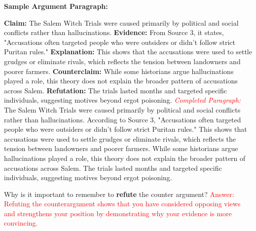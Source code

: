 \documentclass[12pt]{article}
\begin{document}
\vspace{1em}

\begin{tcolorbox}[colframe=black!60, colback=white, 
coltitle=black, colbacktitle=black!15, fonttitle=\bfseries\Large, 
title=Example Paragraph: Writing a Claim, halign title=center, left=10pt, right=10pt, top=10pt, bottom=15pt]
\textbf{Sample Argument Paragraph:}

\textbf{Claim:} The Salem Witch Trials were caused primarily by political and social conflicts rather than hallucinations.  
\textbf{Evidence:} From Source 3, it states, "Accusations often targeted people who were outsiders or didn’t follow strict Puritan rules."  
\textbf{Explanation:} This shows that the accusations were used to settle grudges or eliminate rivals, which reflects the tension between landowners and poorer farmers.  
\textbf{Counterclaim:} While some historians argue hallucinations played a role, this theory does not explain the broader pattern of accusations across Salem.  
\textbf{Refutation:} The trials lasted months and targeted specific individuals, suggesting motives beyond ergot poisoning.  
\textcolor{red}{\textit{Completed Paragraph:}} The Salem Witch Trials were caused primarily by political and social conflicts rather than hallucinations. According to Source 3, "Accusations often targeted people who were outsiders or didn’t follow strict Puritan rules." This shows that accusations were used to settle grudges or eliminate rivals, which reflects the tension between landowners and poorer farmers. While some historians argue hallucinations played a role, this theory does not explain the broader pattern of accusations across Salem. The trials lasted months and targeted specific individuals, suggesting motives beyond ergot poisoning.

\end{tcolorbox}

\vspace{1em}

\begin{tcolorbox}[colframe=black!60, colback=white, 
coltitle=black, colbacktitle=black!15, fonttitle=\bfseries\Large, 
title=Exit Ticket, halign title=center, left=10pt, right=10pt, top=10pt, bottom=15pt]
Why is it important to remember to \textbf{refute} the counter argument?  
\textcolor{red}{Answer: Refuting the counterargument shows that you have considered opposing views and strengthens your position by demonstrating why your evidence is more convincing.}
\end{tcolorbox}
\end{document}
